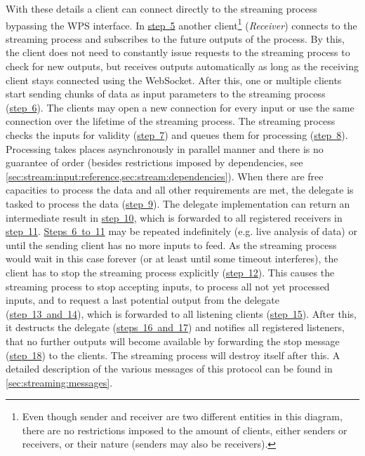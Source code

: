     With these details a client can connect directly to the streaming process bypassing the \ac{WPS} interface. In \hyperref[fig:sd:swps]{step~5} another client\footnote{Even though sender and receiver are two different entities in this diagram, there are no restrictions imposed to the amount of clients, either senders or receivers, or their nature (senders may also be receivers).} (\emph{Receiver}) connects to the streaming process and subscribes to the future outputs of the process. By this, the client does not need to constantly issue requests to the streaming process to check for new outputs, but receives outputs automatically as long as the receiving client stays connected using the WebSocket.
    After this, one or multiple clients start sending chunks of data as input parameters to the streaming process (\hyperref[fig:sd:swps]{step~6}). The clients may open a new connection for every input or use the same connection over the lifetime of the streaming process. The streaming process checks the inputs for validity (\hyperref[fig:sd:swps]{step~7}) and queues them for processing (\hyperref[fig:sd:swps]{step~8}).
    Processing takes places asynchronously in parallel manner and there is no guarantee of order (besides restrictions imposed by dependencies, see \cref{sec:stream:input:reference,sec:stream:dependencies}). When there are free capacities to process the data and all other requirements are met, the delegate is tasked to process the data (\hyperref[fig:sd:swps]{step~9}). The delegate implementation can return an intermediate result in \hyperref[fig:sd:swps]{step~10}, which is forwarded to all registered receivers in \hyperref[fig:sd:swps]{step~11}.
    \hyperref[fig:sd:swps]{Steps~6~to~11} may be repeated indefinitely (e.g. live analysis of data) or until the sending client has no more inputs to feed. As the streaming process would wait in this case forever (or at least until some timeout interferes), the client has to stop the streaming process explicitly (\hyperref[fig:sd:swps]{step~12}).
    This causes the streaming process to stop accepting inputs, to process all not yet processed inputs, and to request a last potential output from the delegate (\hyperref[fig:sd:swps]{step~13~and~14}), which is forwarded to all listening clients (\hyperref[fig:sd:swps]{step~15}). After this, it destructs the delegate (\hyperref[fig:sd:swps]{steps~16~and~17}) and notifies all registered listeners, that no further outputs will become available by forwarding the stop message (\hyperref[fig:sd:swps]{step~18}) to the clients. The streaming process will destroy itself after this. A detailed description of the various messages of this protocol can be found in \cref{sec:streaming:messages}.

